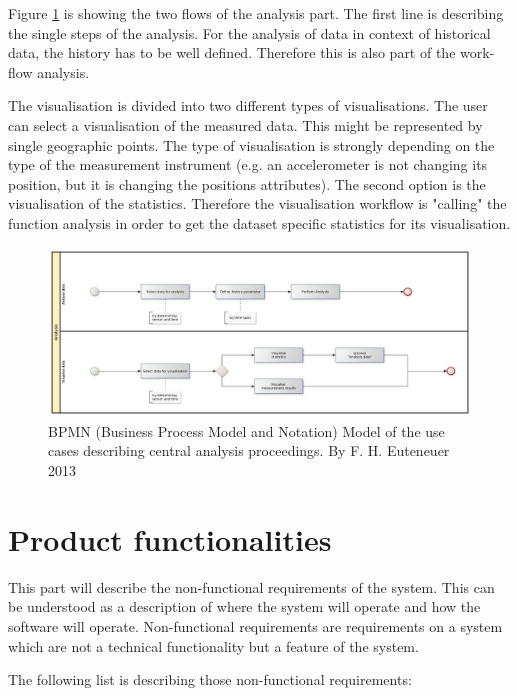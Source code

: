 Figure \ref{fig:bpmn_use-case_analysis} is showing the two flows of the analysis part. The first line is describing the single steps of the analysis. For the analysis of data in context of historical data, the history has to be well defined. Therefore this is also part of the work-flow analysis.

The visualisation is divided into two different types of visualisations. The user can select a visualisation of the measured data. This might be represented by single geographic points. The type of visualisation is strongly depending on the type of the measurement instrument (e.g. an accelerometer is not changing its position, but it is changing the positions attributes). The second option is the visualisation of the statistics. Therefore the visualisation workflow is "calling" the function analysis in order to get the dataset specific statistics for its visualisation.

\begin{figure}[H]
	\centering
 	 \includegraphics[scale=0.24]{graphics/bpmn_use-cases_analysis.jpg} 
	\caption{BPMN (Business Process Model and Notation) Model of the use cases describing central analysis proceedings. By F. H. Euteneuer 2013}
	 \label{fig:bpmn_use-case_analysis}
\end{figure}


\section{Product functionalities}
This part will describe the non-functional requirements of the system. This can be understood as a description of where the system will operate and how the software will operate. Non-functional requirements are requirements on a system which are not a technical functionality but a feature of the system.

The following list is describing those non-functional requirements:

